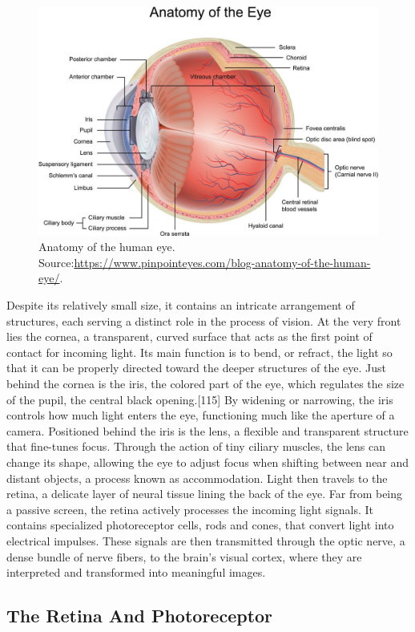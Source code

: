 \documentclass[12pt]{report}
\begin{document}
\begin{figure}[ht]
    \centering
    \includegraphics[width = 0.6
    \textwidth]{Images/Theory/occhio.jpg}
    \caption{Anatomy of the human eye. Source:\url{https://www.pinpointeyes.com/blog-anatomy-of-the-human-eye/}.}
    \label{fig:ana}
\end{figure}

Despite its relatively small size, it contains an intricate arrangement of structures, each serving a distinct role in the process of vision.
At the very front lies the cornea, a transparent, curved surface that acts as the first point of contact for incoming light. 
Its main function is to bend, or refract, the light so that it can be properly directed toward the deeper structures of the eye.
Just behind the cornea is the iris, the colored part of the eye, which regulates the size of the pupil, the central black opening.[115] 
By widening or narrowing, the iris controls how much light enters the eye, functioning much like the aperture of a camera.
Positioned behind the iris is the lens, a flexible and transparent structure that fine-tunes focus. 
Through the action of tiny ciliary muscles, the lens can change its shape, allowing the eye to adjust focus when shifting between near and distant objects, a process known as accommodation.
Light then travels to the retina, a delicate layer of neural tissue lining the back of the eye. 
Far from being a passive screen, the retina actively processes the incoming light signals. 
It contains specialized photoreceptor cells, rods and cones, that convert light into electrical impulses. 
These signals are then transmitted through the optic nerve, a dense bundle of nerve fibers, to the brain's visual cortex, where they are interpreted and transformed into meaningful images.

\subsection{The Retina And Photoreceptor}
\end{document}
